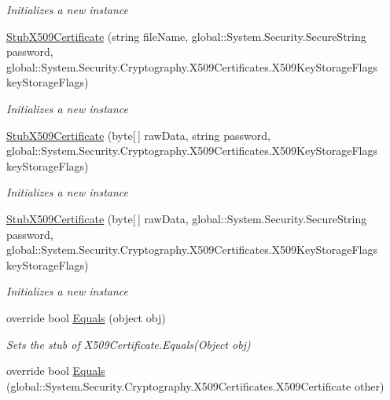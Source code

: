 \begin{DoxyCompactItemize}
\begin{DoxyCompactList}\small\item\em Initializes a new instance\end{DoxyCompactList}\item 
\hyperlink{class_system_1_1_security_1_1_cryptography_1_1_x509_certificates_1_1_fakes_1_1_stub_x509_certificate_accf011760559028c8223b8bd1bf7a6ae}{Stub\-X509\-Certificate} (string file\-Name, global\-::\-System.\-Security.\-Secure\-String password, global\-::\-System.\-Security.\-Cryptography.\-X509\-Certificates.\-X509\-Key\-Storage\-Flags key\-Storage\-Flags)
\begin{DoxyCompactList}\small\item\em Initializes a new instance\end{DoxyCompactList}\item 
\hyperlink{class_system_1_1_security_1_1_cryptography_1_1_x509_certificates_1_1_fakes_1_1_stub_x509_certificate_a36346b4da9f8314629cf2e6500bb7a63}{Stub\-X509\-Certificate} (byte\mbox{[}$\,$\mbox{]} raw\-Data, string password, global\-::\-System.\-Security.\-Cryptography.\-X509\-Certificates.\-X509\-Key\-Storage\-Flags key\-Storage\-Flags)
\begin{DoxyCompactList}\small\item\em Initializes a new instance\end{DoxyCompactList}\item 
\hyperlink{class_system_1_1_security_1_1_cryptography_1_1_x509_certificates_1_1_fakes_1_1_stub_x509_certificate_af1ff8c5fa42aa08c3b0583edbfb79dda}{Stub\-X509\-Certificate} (byte\mbox{[}$\,$\mbox{]} raw\-Data, global\-::\-System.\-Security.\-Secure\-String password, global\-::\-System.\-Security.\-Cryptography.\-X509\-Certificates.\-X509\-Key\-Storage\-Flags key\-Storage\-Flags)
\begin{DoxyCompactList}\small\item\em Initializes a new instance\end{DoxyCompactList}\item 
override bool \hyperlink{class_system_1_1_security_1_1_cryptography_1_1_x509_certificates_1_1_fakes_1_1_stub_x509_certificate_a15f4660675b14ba92830ea9a1a23baa8}{Equals} (object obj)
\begin{DoxyCompactList}\small\item\em Sets the stub of X509\-Certificate.\-Equals(\-Object obj)\end{DoxyCompactList}\item 
override bool \hyperlink{class_system_1_1_security_1_1_cryptography_1_1_x509_certificates_1_1_fakes_1_1_stub_x509_certificate_a28b7edc6362ecefe8b1db0ccdaec9e78}{Equals} (global\-::\-System.\-Security.\-Cryptography.\-X509\-Certificates.\-X509\-Certificate other)

\end{DoxyCompactItemize}
